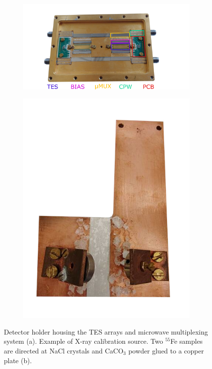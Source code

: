 \begin{figure}[t]
    \begin{subfigure}[b]{0.68\linewidth}
\includegraphics[width=\linewidth]{figures/ch1/holderfi.jpg}
\caption{}
\end{subfigure}
\begin{subfigure}[b]{0.3\linewidth}
    \includegraphics[width=0.9\linewidth]{figures/ch1/calcrop.jpg}
\caption{}
\end{subfigure}
\caption{Detector holder housing the TES arrays and microwave multiplexing system (a). Example of X-ray calibration
source. Two $^{55}$Fe samples are directed at NaCl crystals and CaCO$_3$ powder glued to a copper plate (b).} 
\label{fig:holder}
\end{figure}
